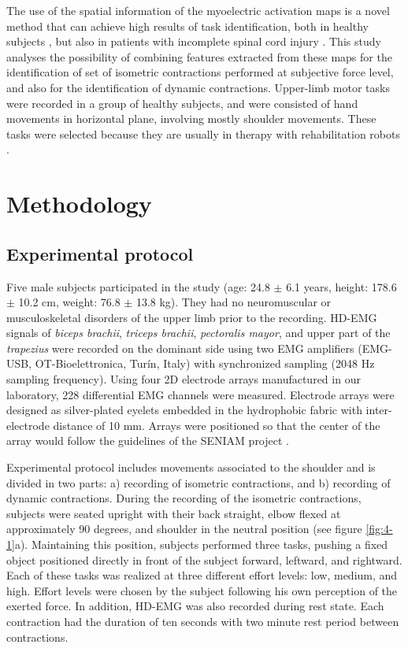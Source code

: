 The use of the spatial information of the myoelectric activation maps is a novel method that can achieve high results of task identification, both in healthy subjects \citep{Stango2015}, but also in patients with incomplete spinal cord injury \citep{Rojas-Martinez2013, Jordanic2016a, Jordanic2016b}. This study analyses the possibility of combining features extracted from these maps for the identification of set of isometric contractions performed at subjective force level, and also for the identification of dynamic contractions. Upper-limb motor tasks were recorded in a group of healthy subjects, and were consisted of hand movements in horizontal plane, involving mostly shoulder movements. These tasks were selected because they are usually in therapy with rehabilitation robots \citep{Badesa2014}.


\section{Methodology}

\subsection{Experimental protocol}
Five male subjects participated in the study (age: 24.8 $\pm$ 6.1 years, height: 178.6 $\pm$ 10.2 cm, weight: 76.8 $\pm$ 13.8 kg). They had no neuromuscular or musculoskeletal disorders of the upper limb prior to the recording. HD-EMG signals of \textit{biceps brachii}, \textit{triceps brachii}, \textit{pectoralis mayor}, and upper part of the \textit{trapezius} were recorded on the dominant side using two EMG amplifiers (EMG-USB, OT-Bioelettronica, Tur\'in, Italy) with synchronized sampling (2048 Hz sampling frequency). Using four 2D electrode arrays manufactured in our laboratory, 228 differential EMG channels were measured. Electrode arrays were designed as silver-plated eyelets embedded in the hydrophobic fabric with inter-electrode distance of 10 mm. Arrays were positioned so that the center of the array would follow the guidelines of the SENIAM project \citep{Hermens1999}.

Experimental protocol includes movements associated to the shoulder and is divided in two parts: a) recording of isometric contractions, and b) recording of dynamic contractions.
During the recording of the isometric contractions, subjects were seated upright with their back straight, elbow flexed at approximately 90 degrees, and shoulder in the neutral position (see figure \ref{fig:4-1}a). Maintaining this position, subjects performed three tasks, pushing a fixed object positioned directly in front of the subject forward, leftward, and rightward. Each of these tasks was realized at three different effort levels: low, medium, and high. Effort levels were chosen by the subject following his own perception of the exerted force. In addition, HD-EMG was also recorded during rest state. Each contraction had the duration of ten seconds with two minute rest period between contractions.

